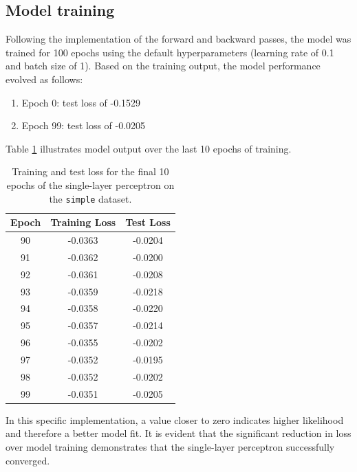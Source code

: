 \documentclass[11pt]{article}
\begin{document}
\subsection*{Model training}
Following the implementation of the forward and backward passes, the model was trained for 100 epochs using the default hyperparameters (learning rate of 0.1 and batch size of 1). 
Based on the training output, the model performance evolved as follows:
\begin{enumerate}
  \item Epoch 0: test loss of -0.1529
  \item Epoch 99: test loss of -0.0205
\end{enumerate}
Table \ref{tab:final_epochsq1} illustrates model output over the last 10 epochs of training.
\clearpage
\begin{table}[htbp]
    \centering
    \caption{Training and test loss for the final 10 epochs of the single-layer perceptron on the \texttt{simple} dataset.}
    \label{tab:final_epochsq1}
    \begin{tabular}{ccc}
        \hline
        \textbf{Epoch} & \textbf{Training Loss} & \textbf{Test Loss} \\ \hline
        90 & -0.0363 & -0.0204 \\
        91 & -0.0362 & -0.0200 \\
        92 & -0.0361 & -0.0208 \\
        93 & -0.0359 & -0.0218 \\
        94 & -0.0358 & -0.0220 \\
        95 & -0.0357 & -0.0214 \\
        96 & -0.0355 & -0.0202 \\
        97 & -0.0352 & -0.0195 \\
        98 & -0.0352 & -0.0202 \\
        99 & -0.0351 & -0.0205 \\ \hline
    \end{tabular}
\end{table}

In this specific implementation, a value closer to zero indicates higher likelihood and therefore a better model fit.
It is evident that the significant reduction in loss over model training demonstrates that the single-layer perceptron successfully converged. 
\end{document}
